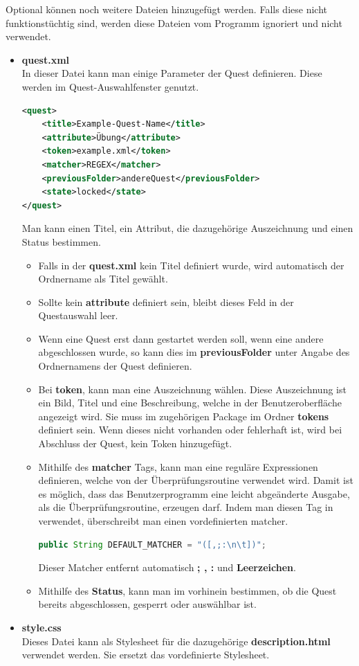 Optional können noch weitere Dateien hinzugefügt werden. Falls diese nicht funktionstüchtig sind, werden diese Dateien vom Programm ignoriert und nicht verwendet.

\begin{itemize}
\item \textbf{quest.xml}\\
In dieser Datei kann man einige Parameter der Quest definieren. Diese werden im Quest-Auswahlfenster genutzt.

\begin{lstlisting}[language=XML]
<quest>
    <title>Example-Quest-Name</title>
    <attribute>Übung</attribute>
    <token>example.xml</token>
    <matcher>REGEX</matcher>
    <previousFolder>andereQuest</previousFolder>
    <state>locked</state>
</quest>
\end{lstlisting}
Man kann einen Titel, ein Attribut, die dazugehörige Auszeichnung und einen Status bestimmen.
\begin{itemize}
\item Falls in der \textbf{quest.xml} kein Titel definiert wurde, wird automatisch der Ordnername als Titel gewählt. 
\item Sollte kein \textbf{attribute} definiert sein, bleibt dieses Feld in der Questauswahl leer.
\item Wenn eine Quest erst dann gestartet werden soll, wenn eine andere abgeschlossen wurde, so kann dies im \textbf{previousFolder} unter Angabe des Ordnernamens der Quest definieren.
\item Bei \textbf{token}, kann man eine Auszeichnung wählen. Diese Auszeichnung ist ein Bild, Titel und eine Beschreibung, welche in der Benutzeroberfläche angezeigt wird. Sie muss im zugehörigen Package im Ordner \textbf{tokens} definiert sein. Wenn dieses nicht vorhanden oder fehlerhaft ist, wird bei Abschluss der Quest, kein Token hinzugefügt.
\item Mithilfe des \textbf{matcher} Tags, kann man eine reguläre Expressionen definieren, welche von der Überprüfungsroutine verwendet wird. Damit ist es möglich, dass das Benutzerprogramm eine leicht abgeänderte Ausgabe, als die Überprüfungsroutine, erzeugen darf. Indem man diesen Tag in verwendet, überschreibt man einen vordefinierten matcher.

\begin{lstlisting}[language=JAVA]
	public String DEFAULT_MATCHER = "([,;:\n\t])";
\end{lstlisting}
Dieser Matcher entfernt automatisch \textbf{; , :} und \textbf{Leerzeichen}.

\item Mithilfe des \textbf{Status}, kann man im vorhinein bestimmen, ob die Quest bereits abgeschlossen, gesperrt oder auswählbar ist.
\end{itemize}

\item \textbf{style.css}\\
Dieses Datei kann als Stylesheet für die dazugehörige \textbf{description.html} verwendet werden. Sie ersetzt das vordefinierte Stylesheet.

\end{itemize}

